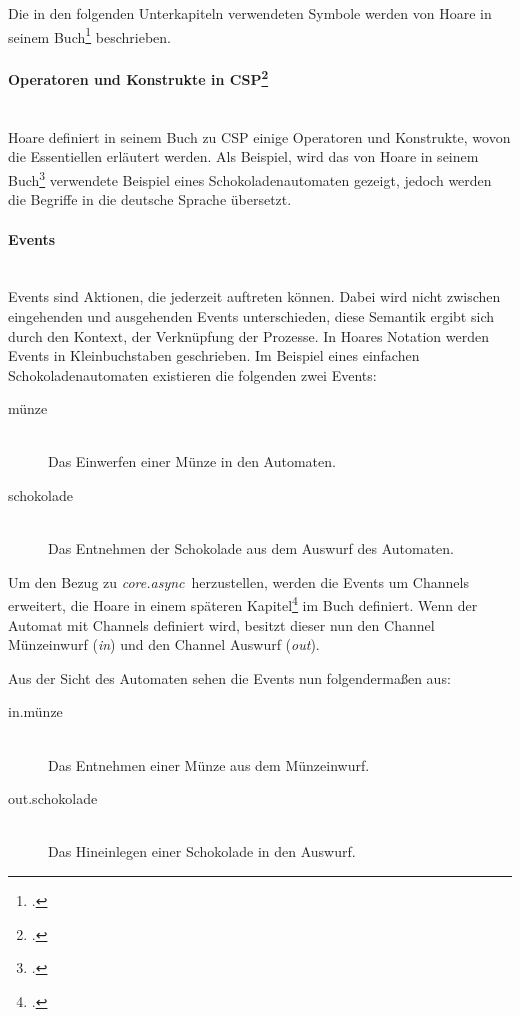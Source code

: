 \documentclass[12pt,a4paper,parskip=half,listof=totoc]{scrreprt}
\newcommand{\CA}{\textit{core.async}}
\begin{document}
Die in den folgenden Unterkapiteln verwendeten Symbole werden von Hoare in seinem Buch\footcite[Glossary of Symbols]{CSPBOOK} beschrieben.

\paragraph{Operatoren und Konstrukte in \acs{CSP}\footcite[Siehe][Kap. 1.1]{CSPBOOK}}
\ \\
Hoare definiert in seinem Buch zu \ac{CSP} einige Operatoren und Konstrukte, wovon die Essentiellen erläutert werden. Als Beispiel, wird das von Hoare in seinem Buch\footcite{CSPBOOK} verwendete Beispiel eines Schokoladenautomaten gezeigt, jedoch werden die Begriffe in die deutsche Sprache übersetzt.

\paragraph{Events}
\ \\
Events sind Aktionen, die jederzeit auftreten können. Dabei wird nicht zwischen eingehenden und ausgehenden Events unterschieden, diese Semantik ergibt sich durch den Kontext, der Verknüpfung der Prozesse. In Hoares Notation werden Events in Kleinbuchstaben geschrieben.
Im Beispiel eines einfachen Schokoladenautomaten existieren die folgenden zwei Events:

\begin{description}
\item[münze]\hfill \\
Das Einwerfen einer Münze in den Automaten.
\item[schokolade]\hfill \\
Das Entnehmen der Schokolade aus dem Auswurf des Automaten.
\end{description}

Um den Bezug zu \CA\ herzustellen, werden die Events um Channels erweitert, die Hoare in einem späteren Kapitel\footcite[Kap. 4.2]{CSPBOOK} im Buch definiert.
Wenn der Automat mit Channels definiert wird, besitzt dieser nun den Channel Münzeinwurf (\textit{in}) und den Channel Auswurf (\textit{out}).

Aus der Sicht des Automaten sehen die Events nun folgendermaßen aus:

\begin{description}
\item[in.münze]\hfill \\
Das Entnehmen einer Münze aus dem Münzeinwurf.
\item[out.schokolade]\hfill \\
Das Hineinlegen einer Schokolade in den Auswurf.
\end{description}
\end{document}
